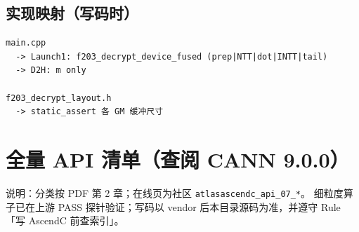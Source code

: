 \documentclass[UTF8,a4paper,11pt]{ctexart}
\begin{document}
\subsection{实现映射（写码时）}

\begin{verbatim}
main.cpp
  -> Launch1: f203_decrypt_device_fused (prep|NTT|dot|INTT|tail)
  -> D2H: m only

f203_decrypt_layout.h
  -> static_assert 各 GM 缓冲尺寸
\end{verbatim}

\section{全量 API 清单（查阅 CANN 9.0.0）}
\label{sec:api-table}

说明：分类按 PDF 第 2 章；在线页为社区 \texttt{atlasascendc\_api\_07\_*}。
细粒度算子已在上游 PASS 探针验证；写码以 vendor 后本目录源码为准，并遵守 Rule「写 AscendC 前查索引」。
\end{document}
